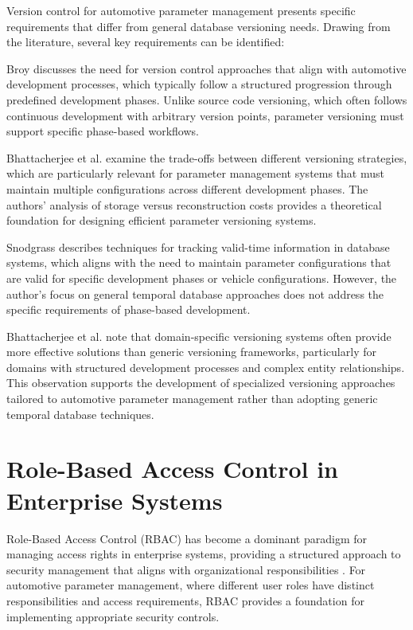 Version control for automotive parameter management presents specific requirements that differ from general database versioning needs. Drawing from the literature, several key requirements can be identified:

Broy \cite{broy2006challenges} discusses the need for version control approaches that align with automotive development processes, which typically follow a structured progression through predefined development phases. Unlike source code versioning, which often follows continuous development with arbitrary version points, parameter versioning must support specific phase-based workflows.

Bhattacherjee et al. \cite{bhattacherjee2015principles} examine the trade-offs between different versioning strategies, which are particularly relevant for parameter management systems that must maintain multiple configurations across different development phases. The authors' analysis of storage versus reconstruction costs provides a theoretical foundation for designing efficient parameter versioning systems.

Snodgrass \cite{snodgrass1999developing} describes techniques for tracking valid-time information in database systems, which aligns with the need to maintain parameter configurations that are valid for specific development phases or vehicle configurations. However, the author's focus on general temporal database approaches does not address the specific requirements of phase-based development.

Bhattacherjee et al. \cite{bhattacherjee2015principles} note that domain-specific versioning systems often provide more effective solutions than generic versioning frameworks, particularly for domains with structured development processes and complex entity relationships. This observation supports the development of specialized versioning approaches tailored to automotive parameter management rather than adopting generic temporal database techniques.

\section{Role-Based Access Control in Enterprise Systems}
\label{sec:role-based-access-control}

Role-Based Access Control (RBAC) has become a dominant paradigm for managing access rights in enterprise systems, providing a structured approach to security management that aligns with organizational responsibilities \cite{sandhu1998role}. For automotive parameter management, where different user roles have distinct responsibilities and access requirements, RBAC provides a foundation for implementing appropriate security controls.

